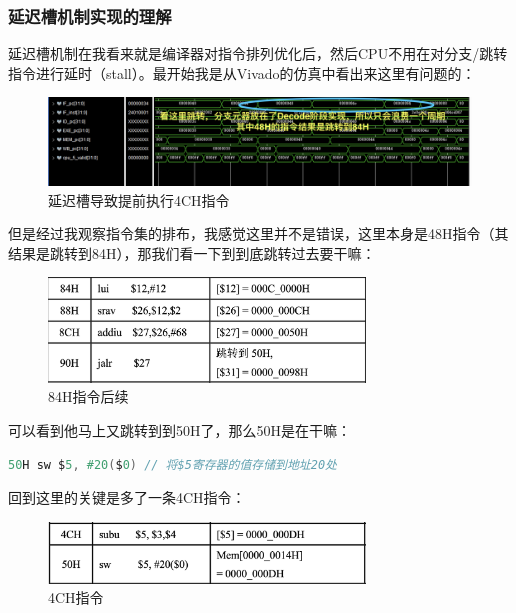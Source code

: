 \documentclass[a4paper]{article}
\begin{document}
\subsubsection{延迟槽机制实现的理解}

延迟槽机制在我看来就是编译器对指令排列优化后，然后CPU不用在对分支/跳转指令进行延时（stall）。最开始我是从Vivado的仿真中看出来这里有问题的：

\begin{figure}[H]
    \centering
    \includegraphics[width=\textwidth]{img/复现流水线/跳转1.png}
    \caption{延迟槽导致提前执行4CH指令}
\end{figure}

但是经过我观察指令集的排布，我感觉这里并不是错误，这里本身是48H指令（其结果是跳转到84H），那我们看一下到到底跳转过去要干嘛：


\begin{figure}[H]
    \centering
    \includegraphics[width=0.75\textwidth]{img/复现流水线/84H.png}
    \caption{84H指令后续}
\end{figure}

可以看到他马上又跳转到到50H了，那么50H是在干嘛：

\begin{lstlisting}[language=Verilog]
    50H sw $5, #20($0) // 将$5寄存器的值存储到地址20处
\end{lstlisting}

回到这里的关键是多了一条4CH指令：


\begin{figure}[H]
    \centering
    \includegraphics[width=0.75\textwidth]{img/复现流水线/4CH.png}
    \caption{4CH指令}
\end{figure}
\end{document}
